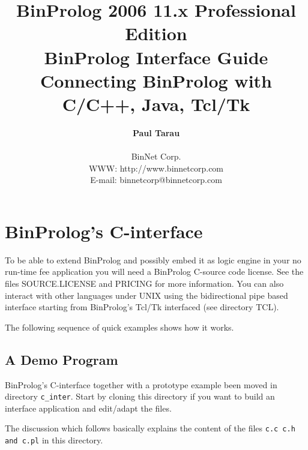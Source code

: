 \documentclass{article}
\begin{document}
\pagestyle{plain}




\title{
\Huge
BinProlog 2006 11.x Professional Edition\\
BinProlog Interface Guide\\
Connecting BinProlog with C/C++, Java, Tcl/Tk %
\vskip 5cm
}


\author{
\Large
   {\bf Paul Tarau}\\\\
\large
   BinNet Corp.\\
   WWW: http://www.binnetcorp.com\\
   {E-mail: binnetcorp@binnetcorp.com}
\normalsize
}


\vskip 5cm
\maketitle

\newpage



\section{BinProlog's C-interface}

To be able to extend BinProlog and possibly embed it as logic
engine in your no run-time fee application you will need
a BinProlog C-source code
license. See the files SOURCE.LICENSE and PRICING for more information.
You can also interact with other languages under UNIX using the
bidirectional pipe based interface starting from BinProlog's Tcl/Tk
interfaced (see directory TCL).

The following sequence of quick examples shows how it works.

\subsection{A Demo Program}

BinProlog's C-interface together with a prototype example been moved in
directory {\tt c\_inter}. Start by cloning this directory if you
want to build an interface application and edit/adapt the files.

The discussion which follows basically explains
the content of the files {\tt c.c c.h and c.pl} in this directory.
\end{document}

